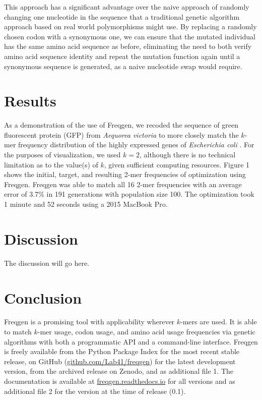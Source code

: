 \documentclass{article}
\begin{document}
This approach has a significant advantage over the naive approach of randomly changing one nucleotide in the sequence that a traditional genetic algorithm approach based on real world polymorphisms might use. By replacing a randomly chosen codon with a synonymous one, we can ensure that the mutated individual has the same amino acid sequence as before, eliminating the need to both verify amino acid sequence identity and repeat the mutation function again until a synonymous sequence is generated, as a naive nucleotide swap would require.


\section{Results}

As a demonstration of the use of Freqgen, we recoded the sequence of green fluorescent protein (GFP) from \textit{Aequorea victoria} \cite{Prasher1992} to more closely match the $k$-mer frequency distribution of the highly expressed genes of \textit{Escherichia coli} \cite{Puigbo2007}. For the purposes of visualization, we used $k=2$, although there is no technical limitation as to the value(s) of $k$, given sufficient computing resources. Figure 1 shows the initial, target, and resulting 2-mer frequencies of optimization using Freqgen. Freqgen was able to match all 16 2-mer frequencies with an average error of 3.7\% in 191 generations with population size 100. The optimization took 1 minute and 52 seconds using a 2015 MacBook Pro. 

\section{Discussion}

The discussion will go here.

\section{Conclusion}

Freqgen is a promising tool with applicability wherever $k$-mers are used. It is able to match $k$-mer usage, codon usage, and amino acid usage frequencies via genetic algorithms with both a programmatic API and a command-line interface. Freqgen is freely available from the Python Package Index for the most recent stable release, on GitHub (\href{https://www.github.com/Lab41/freqgen}{github.com/Lab41/freqgen}) for the latest development version, from the archived release on Zenodo, and as additional file 1. The documentation is available at \href{https://freqgen.readthedocs.io}{freqgen.readthedocs.io} for all versions and as additional file 2 for the version at the time of release (0.1).

\printbibliography
\end{document}
